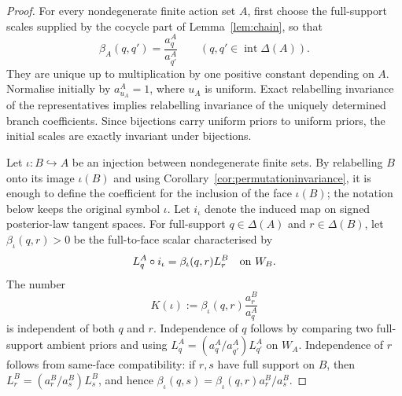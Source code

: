 \documentclass[11pt,a4paper]{article}
\theoremstyle{definition}
\newcommand{\1}{\mathbf 1}
\begin{document}
\begin{proof}
For every nondegenerate finite action set $A$, first choose the full-support scales supplied by the cocycle part of
Lemma~\ref{lem:chain}, so that
\[
\beta_A(q,q')=\frac{a^A_q}{a^A_{q'}}
\qquad(q,q'\in\operatorname{int}\Delta(A)).
\]
They are unique up to multiplication by one positive constant depending on $A$.  Normalise initially by
$a^A_{u_A}=1$, where $u_A$ is uniform.  Exact relabelling invariance of the representatives implies relabelling
invariance of the uniquely determined branch coefficients.  Since bijections carry uniform priors to uniform priors,
the initial scales are exactly invariant under bijections.

Let $\iota:B\hookrightarrow A$ be an injection between nondegenerate finite sets.  By relabelling $B$ onto its image
$\iota(B)$ and using Corollary~\ref{cor:permutationinvariance}, it is enough to define the coefficient for the inclusion
of the face $\iota(B)$; the notation below keeps the original symbol $\iota$.  Let $i_\iota$ denote the induced map on
signed posterior-law tangent spaces.  For full-support $q\in\Delta(A)$ and $r\in\Delta(B)$, let
$\beta_\iota(q,r)>0$ be the full-to-face scalar characterised by
\[
L_q^A\circ i_\iota=\beta_\iota(q,r)L_r^B
\quad\hbox{on }W_B.
\]
The number
\begin{equation}
K(\iota):=\beta_\iota(q,r)\frac{a^B_r}{a^A_q}
\tag{K}\label{eq:embeddingdefect}
\end{equation}
is independent of both $q$ and $r$.  Independence of $q$ follows by comparing two full-support ambient priors and using
$L_q^A=(a_q^A/a_{q'}^A)L_{q'}^A$ on $W_A$.  Independence of $r$ follows from same-face compatibility: if $r,s$ have
full support on $B$, then $L_r^B=(a_r^B/a_s^B)L_s^B$, and hence
$\beta_\iota(q,s)=\beta_\iota(q,r)a_r^B/a_s^B$.


\end{proof}
\end{document}
